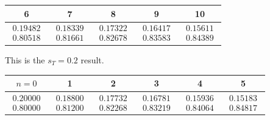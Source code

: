 \begin{exercises}
\begin{answer}
\begin{exparts}
\begin{center}
\begin{tabular}{|ccccc}
               6  &7  &8  &9 &10 \\ 
               \hline
               $\begin{array}{c}  0.19482 \\ 0.80518 \end{array}$
               &$\begin{array}{c}  0.18339 \\ 0.81661 \end{array}$
               &$\begin{array}{c}  0.17322 \\ 0.82678 \end{array}$
               &$\begin{array}{c}  0.16417 \\ 0.83583 \end{array}$
               &$\begin{array}{c}  0.15611 \\ 0.84389 \end{array}$
             \end{tabular}
           \end{center}
         \partsitem This is the $s_T=0.2$ result.
           \begin{center}
             \begin{tabular}{c|ccccc}
               $n=0$ &1  &2  &3  &4  &5  \\ 
               \hline
               $\begin{array}{c}  0.20000 \\ 0.80000 \end{array}$
               &$\begin{array}{c}   0.18800 \\ 0.81200 \end{array}$
               &$\begin{array}{c}   0.17732 \\ 0.82268 \end{array}$
               &$\begin{array}{c}   0.16781 \\ 0.83219 \end{array}$
               &$\begin{array}{c}   0.15936 \\ 0.84064 \end{array}$
               &$\begin{array}{c}   0.15183 \\ 0.84817 \end{array}$
             \end{tabular}                                         \\[1ex]

\end{center}
\end{exparts}
\end{answer}
\end{exercises}
